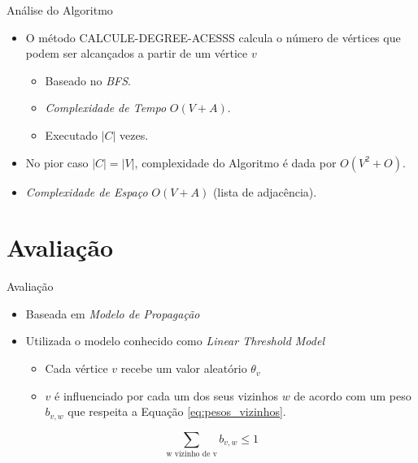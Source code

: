 \documentclass[t,14pt,mathserif,xcolor=table]{beamer}
\begin{document}
\begin{frame}{Análise do Algoritmo}

	\begin{itemize}
		\item O método \textsc{CALCULE-DEGREE-ACESSS}{} calcula o número de vértices que podem ser alcançados a partir de um vértice $v$
		\begin{itemize}
		
			\item Baseado no \textit{BFS}{}.
			\item \textit{Complexidade de Tempo} $O(V+A)${}.
			\item Executado $|C|$ vezes{}.
		
		\end{itemize}

		\item No pior caso $|C| = |V|$, complexidade do Algoritmo é dada por $O(V^{2}+O)${}.
		
		\item \textit{Complexidade de Espaço} $O(V+A)$ (lista de adjacência){}.
		
	\end{itemize}




\end{frame}


\section{Avaliação}

\begin{frame}{Avaliação}

	\begin{itemize}
		
		\item Baseada em \textit{Modelo de Propagação}
		\item Utilizada o modelo conhecido como \textit{Linear Threshold Model} \cite{granovetter1978threshold, schelling2006micromotives}{}
		\begin{itemize}
			\item Cada vértice $v$ recebe um valor aleatório $\theta_v$
			\item  $v$ é influenciado por cada um dos seus vizinhos $w$ de acordo com um peso $b_{v,w}$ que respeita a Equação \ref{eq:pesos_vizinhos}{}.
		\end{itemize}	
		
	\end{itemize}
	
\begin{equation} \label{eq:pesos_vizinhos}
\sum\limits_{\textrm{w vizinho de v}}{b_{v,w} \leq 1}
\end{equation}


\end{frame}
\end{document}
